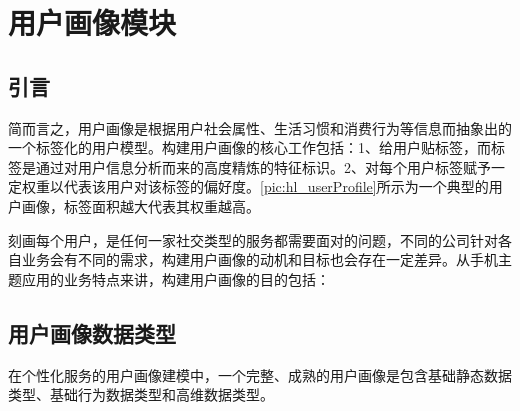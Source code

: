 
\chapter{用户画像模块}
\section{引言}
\label{chap:example}
简而言之，用户画像是根据用户社会属性、生活习惯和消费行为等信息而抽象出的一个标签化的用户模型。构建用户画像的核心工作包括：1、给用户贴标签，而标签是通过对用户信息分析而来的高度精炼的特征标识。2、对每个用户标签赋予一定权重以代表该用户对该标签的偏好度。\autoref{pic:hl_userProfile}所示为一个典型的用户画像，标签面积越大代表其权重越高。

刻画每个用户，是任何一家社交类型的服务都需要面对的问题，不同的公司针对各自业务会有不同的需求，构建用户画像的动机和目标也会存在一定差异。从手机主题应用的业务特点来讲，构建用户画像的目的包括：

\begin{figure}
\centering
  \label{pic:hl_userProfile}
\end{figure}


    \section{用户画像数据类型}
    在个性化服务的用户画像建模中，一个完整、成熟的用户画像是包含基础静态数据类型、基础行为数据类型和高维数据类型。
